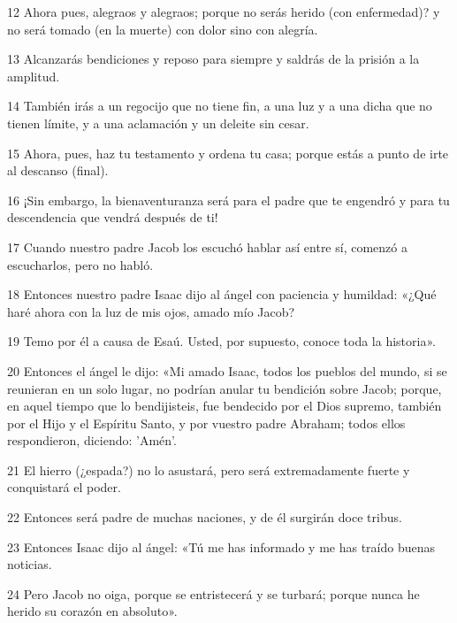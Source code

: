 \par 12 Ahora pues, alegraos y alegraos; porque no serás herido (con enfermedad)? y no será tomado (en la muerte) con dolor sino con alegría.

\par 13 Alcanzarás bendiciones y reposo para siempre y saldrás de la prisión a la amplitud.

\par 14 También irás a un regocijo que no tiene fin, a una luz y a una dicha que no tienen límite, y a una aclamación y un deleite sin cesar.

\par 15 Ahora, pues, haz tu testamento y ordena tu casa; porque estás a punto de irte al descanso (final).

\par 16 ¡Sin embargo, la bienaventuranza será para el padre que te engendró y para tu descendencia que vendrá después de ti!

\par 17 Cuando nuestro padre Jacob los escuchó hablar así entre sí, comenzó a escucharlos, pero no habló.

\par 18 Entonces nuestro padre Isaac dijo al ángel con paciencia y humildad: «¿Qué haré ahora con la luz de mis ojos, amado mío Jacob?

\par 19 Temo por él a causa de Esaú. Usted, por supuesto, conoce toda la historia».

\par 20 Entonces el ángel le dijo: «Mi amado Isaac, todos los pueblos del mundo, si se reunieran en un solo lugar, no podrían anular tu bendición sobre Jacob; porque, en aquel tiempo que lo bendijisteis, fue bendecido por el Dios supremo, también por el Hijo y el Espíritu Santo, y por vuestro padre Abraham; todos ellos respondieron, diciendo: 'Amén'.

\par 21 El hierro (¿espada?) no lo asustará, pero será extremadamente fuerte y conquistará el poder.

\par 22 Entonces será padre de muchas naciones, y de él surgirán doce tribus.

\par 23 Entonces Isaac dijo al ángel: «Tú me has informado y me has traído buenas noticias.

\par 24 Pero Jacob no oiga, porque se entristecerá y se turbará; porque nunca he herido su corazón en absoluto».

